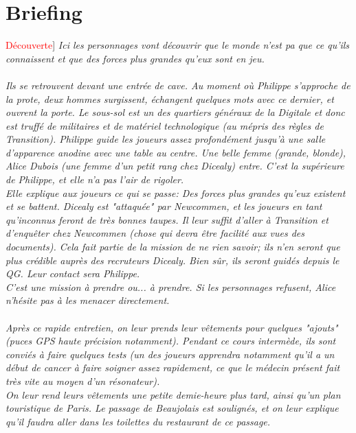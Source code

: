 \documentclass[10pt,a4paper,twocolumn]{article}
\newenvironment{lAbstract}[1]{{[}\textcolor{red}{#1}{]}\itshape}{\\ \\}
\begin{document}
\section{Briefing}
\begin{lAbstract}{Découverte}
Ici les personnages vont découvrir que le monde n'est pa que ce qu'ils connaissent et que des forces plus grandes qu'eux sont en jeu.
\end{lAbstract}
Ils se retrouvent devant une entrée de cave. Au moment où Philippe s'approche de la prote, deux hommes surgissent, échangent quelques mots avec ce dernier, et ouvrent la porte. Le sous-sol est un des quartiers généraux de la Digitale et donc est truffé de militaires et de matériel technologique (au mépris des règles de Transition). Philippe guide les joueurs assez profondément jusqu'à une salle d'apparence anodine avec une table au centre. Une belle femme (grande, blonde), Alice Dubois (une femme d'un petit rang chez Dicealy) entre. C'est la supérieure de Philippe, et elle n'a pas l'air de rigoler.\\
Elle explique aux joueurs ce qui se passe: Des forces plus grandes qu'eux existent et se battent. Dicealy est "attaquée" par Newcommen, et les joueurs en tant qu'inconnus feront de très bonnes taupes. Il leur suffit d'aller à Transition et d'enquêter chez Newcommen (chose qui devra être facilité aux vues des documents). Cela fait partie de la mission de ne rien savoir; ils n'en seront que plus crédible auprès des recruteurs Dicealy. Bien sûr, ils seront guidés depuis le QG. Leur contact sera Philippe.\\
C'est une mission à prendre ou... à prendre. Si les personnages refusent, Alice n'hésite pas à les menacer directement.
\\
\\
Après ce rapide entretien, on leur prends leur vêtements pour quelques "ajouts" (puces GPS haute précision notamment). Pendant ce cours intermède, ils sont conviés à faire quelques tests (un des joueurs apprendra notamment qu'il a un début de cancer à faire soigner assez rapidement, ce que le médecin présent fait très vite au moyen d'un résonateur).
\\
On leur rend leurs vêtements une petite demie-heure plus tard, ainsi qu'un plan touristique de Paris. Le passage de Beaujolais est soulignés, et on leur explique qu'il faudra aller dans les toilettes du restaurant de ce passage.
\end{document}
